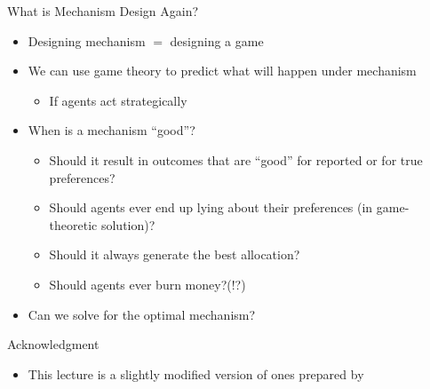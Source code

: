 \documentclass[11pt,aspectratio=169,handout]{beamer}
\begin{document}
  \begin{frame}{What is Mechanism Design Again?}
   \begin{itemize}[<+->]
   \setlength{\itemsep}{1.2em}
    \item Designing mechanism $=$ designing a game
    \item We can use game theory to predict what will happen under mechanism
    \begin{itemize}
     \item If agents act strategically
    \end{itemize}     
    \item When is a mechanism ``good''?
    \begin{itemize}
     \item Should it result in outcomes that are ``good'' for \alert{reported} or for \alert{true} preferences?
     \item Should agents ever end up lying about their preferences (in game-theoretic solution)?
     \item Should it always generate the best allocation?
     \item Should agents ever burn money?(!?)
    \end{itemize}
    \item Can we solve for the optimal mechanism?
   \end{itemize}
  \end{frame}
  
  \begin{frame}{Acknowledgment}
   \begin{itemize}
    \setlength{\itemsep}{1em}
    \item This lecture is a slightly modified version of ones prepared by
   \end{itemize}
  \end{frame}
 
\end{document}
